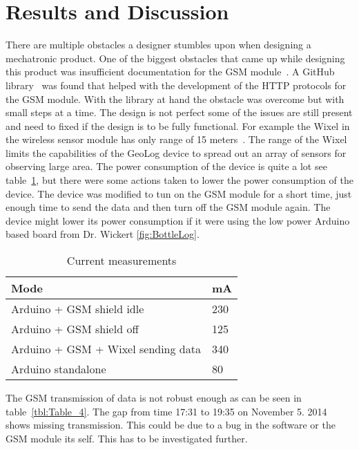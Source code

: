 \section{Results and Discussion}
There are multiple obstacles a designer stumbles upon when designing a mechatronic product.
One of the biggest obstacles that came up while designing this product was insufficient documentation for the GSM module~\cite{SM5100B}.
A GitHub library~\cite{meirm} was found that helped with the development of the HTTP protocols for the GSM module. With the library at hand the obstacle was overcome but with small steps at a time.
The design is not perfect some of the issues are still present and need to fixed if the design is to be fully functional. For example the Wixel in the wireless sensor module has only range of 15 meters~\cite{wixel}. The range of the Wixel limits the capabilities of the GeoLog device to spread out an array of sensors for observing large area. The power consumption of the device is quite a lot see table~\ref{tbl:current}, but there were some actions taken to lower the power consumption of the device. The device was modified to tun on the GSM module for a short time, just enough time to send the data and then turn off the GSM module again. The device might lower its power consumption if it were using the low power Arduino based board from Dr. Wickert \ref{fig:BottleLog}. 
\begin{table}[H]
	\caption{Current measurements}
	\label{tbl:current}
\begin{tabular}{|p{8cm}|p{8cm}|}
		\hline \textbf{Mode} & \textbf{mA} \\ 
		\hline Arduino + GSM shield idle &   230 \\
		\hline Arduino + GSM shield off &   125 \\
		\hline Arduino + GSM + Wixel sending data &  340 \\
		\hline Arduino standalone & 80 \\
		\hline
	\end{tabular}
\end{table}
The GSM transmission of data is not robust enough as can be seen in table~\ref{tbl:Table_4}. The gap from time 17:31 to 19:35 on November 5. 2014 shows missing transmission. This could be due to a bug in the software or the GSM module its self. This has to be investigated further.



